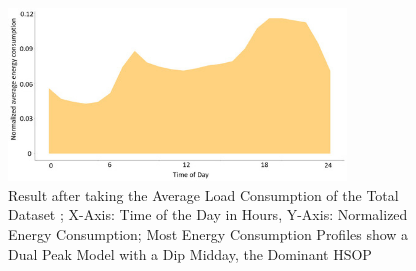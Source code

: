 \begin{figure}
    \centering
    \includegraphics[width=0.8\textwidth]{figures/malatesta_hsop/malatesta_totalDataAveraging.jpg}
    \caption{Result after taking the Average Load Consumption of the Total Dataset \cite{MAL-HBP};
    X-Axis: Time of the Day in Hours, Y-Axis: Normalized Energy Consumption;
    Most Energy Consumption Profiles show a Dual Peak Model with a Dip Midday, the Dominant HSOP}
    \label{fig:total_data_averaging}
\end{figure}





